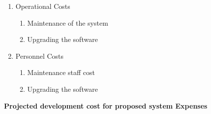 \begin{enumerate}
\begin{enumerate}
  \item{Operational Costs}
    \begin{enumerate}
    \item{Maintenance of the system}
    \item{Upgrading the software}
    \end{enumerate}

  \item{Personnel Costs}
    \begin{enumerate}
    \item{Maintenance staff cost}
    \item{Upgrading the software}
    \end{enumerate}
    
  \end{enumerate}
\end{enumerate}

\bfseries{Projected development cost for proposed system}
Expenses
